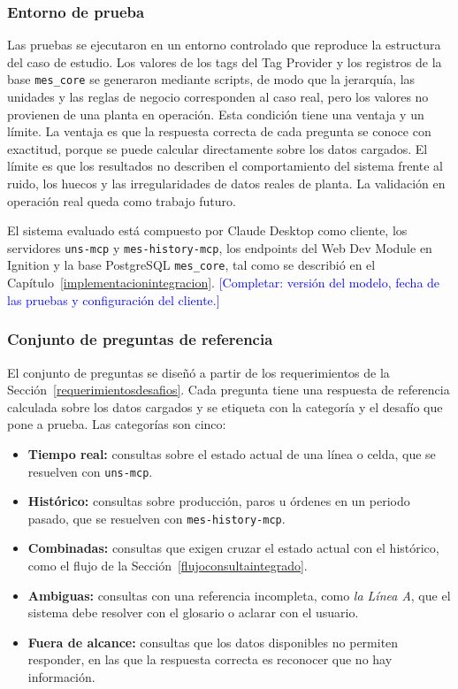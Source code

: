 \subsubsection{Entorno de prueba}

Las pruebas se ejecutaron en un entorno controlado que reproduce la estructura del caso de estudio. Los valores de los tags del Tag Provider y los registros de la base \texttt{mes\_core} se generaron mediante scripts, de modo que la jerarquía, las unidades y las reglas de negocio corresponden al caso real, pero los valores no provienen de una planta en operación. Esta condición tiene una ventaja y un límite. La ventaja es que la respuesta correcta de cada pregunta se conoce con exactitud, porque se puede calcular directamente sobre los datos cargados. El límite es que los resultados no describen el comportamiento del sistema frente al ruido, los huecos y las irregularidades de datos reales de planta. La validación en operación real queda como trabajo futuro.

El sistema evaluado está compuesto por Claude Desktop como cliente, los servidores \texttt{uns-mcp} y \texttt{mes-history-mcp}, los endpoints del Web Dev Module en Ignition y la base PostgreSQL \texttt{mes\_core}, tal como se describió en el Capítulo~\ref{implementacionintegracion}. \textcolor{blue}{[Completar: versión del modelo, fecha de las pruebas y configuración del cliente.]}

\subsubsection{Conjunto de preguntas de referencia}

El conjunto de preguntas se diseñó a partir de los requerimientos de la Sección~\ref{requerimientosdesafios}. Cada pregunta tiene una respuesta de referencia calculada sobre los datos cargados y se etiqueta con la categoría y el desafío que pone a prueba. Las categorías son cinco:

\begin{itemize}
    \item \textbf{Tiempo real:} consultas sobre el estado actual de una línea o celda, que se resuelven con \texttt{uns-mcp}.
    \item \textbf{Histórico:} consultas sobre producción, paros u órdenes en un periodo pasado, que se resuelven con \texttt{mes-history-mcp}.
    \item \textbf{Combinadas:} consultas que exigen cruzar el estado actual con el histórico, como el flujo de la Sección~\ref{flujoconsultaintegrado}.
    \item \textbf{Ambiguas:} consultas con una referencia incompleta, como \textit{la Línea A}, que el sistema debe resolver con el glosario o aclarar con el usuario.
    \item \textbf{Fuera de alcance:} consultas que los datos disponibles no permiten responder, en las que la respuesta correcta es reconocer que no hay información.
\end{itemize}

